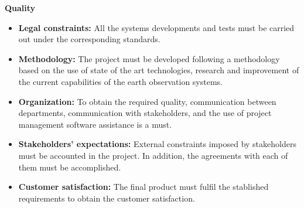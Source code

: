\textbf{Quality}

\begin{itemize}
	
	\item \textbf{Legal constraints:} All the systems developments and tests must be carried out under the corresponding standards. 
	
	\item \textbf{Methodology:} The project must be developed following a methodology based on the use of state of the art technologies, research and improvement of the current capabilities of the earth observation systems.
	
	\item \textbf{Organization:} To obtain the required quality, communication between departments, communication with stakeholders, and the use of project management software assistance is a must.
	
	\item \textbf{Stakeholders’ expectations:} External constraints imposed by stakeholders must be accounted in the project. In addition, the agreements with each of them must be accomplished.
	
	\item \textbf{Customer satisfaction:} The final product must fulfil the stablished requirements to obtain the customer satisfaction.
	
\end{itemize}